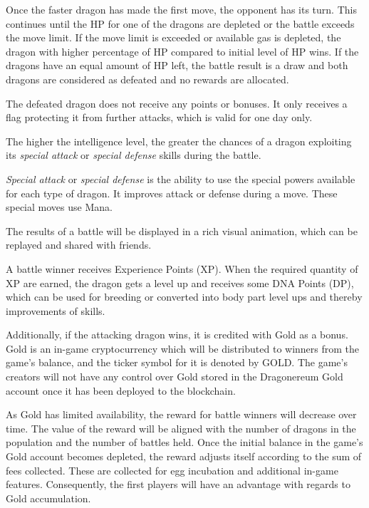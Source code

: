 \documentclass[12pt]{article}
\begin{document}
Once the faster dragon has made the first move, the opponent has its turn. This continues until the HP for one of the dragons are depleted or the battle exceeds the move limit. If the move limit is exceeded or available gas is depleted, the dragon with higher percentage of HP compared to initial level of HP wins. If the dragons have an equal amount of HP left, the battle result is a draw and both dragons are considered as defeated and no rewards are allocated.\par

The defeated dragon does not receive any points or bonuses. It only receives a flag protecting it from further attacks, which is valid for one day only.\par

The higher the intelligence level, the greater the chances of a dragon exploiting its \textit{special attack} or \textit{special defense} skills during the battle.\par

\textit{Special attack} or \textit{special defense} is the ability to use the special powers available for each type of dragon. It improves attack or defense during a move. These special moves use Mana.\par

The results of a battle will be displayed in a rich visual animation, which can be replayed and shared with friends.\par

A battle winner receives Experience Points (XP). When the required quantity of XP are earned, the dragon gets a level up and receives some DNA Points (DP), which can be used for breeding or converted into body part level ups and thereby improvements of skills. \par

Additionally, if the attacking dragon wins, it is credited with Gold as a bonus. Gold is an in-game cryptocurrency which will be distributed to winners from the game’s balance, and the ticker symbol for it is denoted by GOLD. The game’s creators will not have any control over Gold stored in the Dragonereum Gold account once it has been deployed to the blockchain. \par

As Gold has limited availability, the reward for battle winners will decrease over time. The value of the reward will be aligned with the number of dragons in the population and the number of battles held. Once the initial balance in the game's Gold account becomes depleted, the reward adjusts itself according to the sum of fees collected. These are collected for egg incubation and additional in-game features. Consequently, the first players will have an advantage with regards to Gold accumulation.\par
\end{document}
